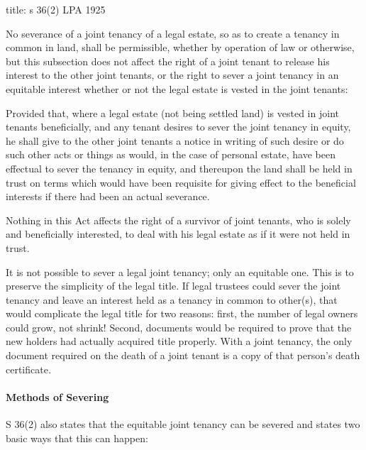 \documentclass[
]{article}
\newenvironment{Shaded}{}{}
\newcommand{\NormalTok}[1]{#1}
\begin{document}
\begin{Shaded}
\begin{Highlighting}[]
\NormalTok{title: s 36(2) LPA 1925}

\NormalTok{No severance of a joint tenancy of a legal estate, so as to create a tenancy in common in land, shall be permissible, whether by operation of law or otherwise, but this subsection does not affect the right of a joint tenant to release his interest to the other joint tenants, or the right to sever a joint tenancy in an equitable interest whether or not the legal estate is vested in the joint tenants:}

\NormalTok{Provided that, where a legal estate (not being settled land) is vested in joint tenants beneficially, and any tenant desires to sever the joint tenancy in equity, he shall give to the other joint tenants a notice in writing of such desire or do such other acts or things as would, in the case of personal estate, have been effectual to sever the tenancy in equity, and thereupon the land shall be held in trust on terms which would have been requisite for giving effect to the beneficial interests if there had been an actual severance.}

\NormalTok{Nothing in this Act affects the right of a survivor of joint tenants, who is solely and beneficially interested, to deal with his legal estate as if it were not held in trust.}
\end{Highlighting}
\end{Shaded}

It is not possible to sever a legal joint tenancy; only an equitable
one. This is to preserve the simplicity of the legal title. If legal
trustees could sever the joint tenancy and leave an interest held as a
tenancy in common to other(s), that would complicate the legal title for
two reasons: first, the number of legal owners could grow, not shrink!
Second, documents would be required to prove that the new holders had
actually acquired title properly. With a joint tenancy, the only
document required on the death of a joint tenant is a copy of that
person's death certificate.

\hypertarget{methods-of-severing}{%
\paragraph{Methods of Severing}\label{methods-of-severing}}

S 36(2) also states that the equitable joint tenancy can be severed and
states two basic ways that this can happen:
\end{document}
